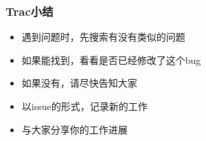 \begin{frame}
    \frametitle{Trac小结}
    \begin{itemize}    
        \item 遇到问题时，先搜索有没有类似的问题
        \item 如果能找到，看看是否已经修改了这个bug
        \item 如果没有，请尽快告知大家
        \item 以issue的形式，记录新的工作
        \item 与大家分享你的工作进展
    \end{itemize}
\end{frame}
